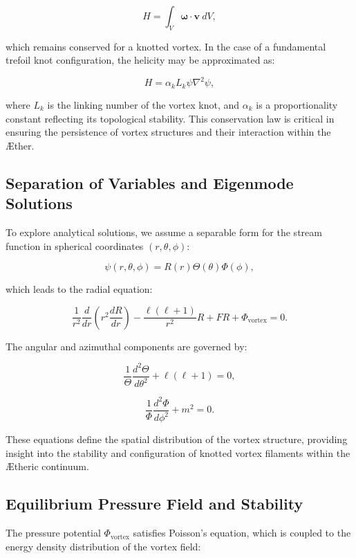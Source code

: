 \begin{equation}
H = \int_V \boldsymbol{\omega} \cdot \mathbf{v} \ dV,
\end{equation}

which remains conserved for a knotted vortex. In the case of a fundamental trefoil knot configuration, the helicity may be approximated as:

\begin{equation}
H = \alpha_k L_k \psi \nabla^2 \psi,
\end{equation}

where $L_k$ is the linking number of the vortex knot, and $\alpha_k$ is a proportionality constant reflecting its topological stability. This conservation law is critical in ensuring the persistence of vortex structures and their interaction within the \AE ther.

\subsection{Separation of Variables and Eigenmode Solutions}
To explore analytical solutions, we assume a separable form for the stream function in spherical coordinates $(r, \theta, \phi)$:

\begin{equation}
\psi(r, \theta, \phi) = R(r) \Theta(\theta) \Phi(\phi),
\end{equation}

which leads to the radial equation:

\begin{equation}
\frac{1}{r^2} \frac{d}{dr} \left( r^2 \frac{dR}{dr} \right) - \frac{\ell (\ell+1)}{r^2} R + F R + \Phi_{\text{vortex}} = 0.
\end{equation}

The angular and azimuthal components are governed by:

\begin{equation}
\frac{1}{\Theta} \frac{d^2\Theta}{d\theta^2} + \ell(\ell+1) = 0,
\end{equation}

\begin{equation}
\frac{1}{\Phi} \frac{d^2\Phi}{d\phi^2} + m^2 = 0.
\end{equation}

These equations define the spatial distribution of the vortex structure, providing insight into the stability and configuration of knotted vortex filaments within the \AE theric continuum.

\subsection{Equilibrium Pressure Field and Stability}
The pressure potential $\Phi_{\text{vortex}}$ satisfies Poisson's equation, which is coupled to the energy density distribution of the vortex field:

